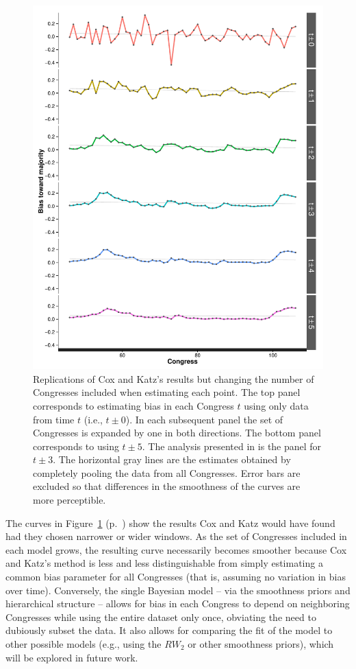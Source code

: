 \begin{figure}
\centering
\includegraphics[scale=0.75]{sections/figs/ck_hypothetical}
\caption{Replications of Cox and Katz's results but changing the number of Congresses 
included when estimating each point. The top panel corresponds to estimating bias in each 
Congress $t$ using only data from time $t$ (i.e., $t \pm 0$). In each subsequent panel the 
set of Congresses is expanded by one in both directions. The bottom panel corresponds to 
using $t \pm 5$. The analysis presented in \protect{} is the 
panel for $t \pm 3$. The horizontal gray lines are the estimates obtained by completely 
pooling the data from all Congresses. Error bars are excluded so that differences in the 
smoothness of the curves are more perceptible.}
\label{fig:ck_hypothetical}
\end{figure}


The curves in Figure~\ref{fig:ck_hypothetical} (p.~\pageref{fig:ck_hypothetical}) show the 
results Cox and Katz would have found had they chosen narrower or wider windows. As the 
set of Congresses included in each model grows, the resulting curve necessarily becomes 
smoother because Cox and Katz's method is less and less distinguishable from simply 
estimating a common bias parameter for all Congresses (that is, assuming no variation in 
bias over time). Conversely, the single Bayesian model -- via the smoothness priors and  
hierarchical structure -- allows for bias in each Congress to depend on neighboring 
Congresses while using the entire dataset only once, obviating the need to dubiously subset 
the data. It also allows for comparing the fit of the model to other possible models (e.g., using
the $RW_2$ or other smoothness priors), which will be explored in future work. 
